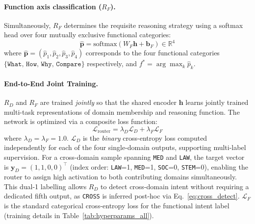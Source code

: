 \documentclass[a4paper,fleql,doubleblind]{cas-sc}
\begin{document}
\paragraph{Function axis classification ($R_F$).}
Simultaneously, $R_F$ determines the requisite reasoning strategy using a
softmax head over four mutually exclusive functional categories:
\begin{equation}
    \hat{\mathbf{p}} = \text{softmax}(W_F \mathbf{h} + \mathbf{b}_F)
    \in \mathbb{R}^4
    \label{eq:func}
\end{equation}
where $\hat{\mathbf{p}} = (\hat{p}_1, \hat{p}_2, \hat{p}_3, \hat{p}_4)$
corresponds to the four functional categories
$\{\texttt{What},\, \texttt{How},\, \texttt{Why},\, \texttt{Compare}\}$
respectively, and $f^* = \arg\max_k \hat{p}_k$.

\paragraph{End-to-End Joint Training.}
$R_D$ and $R_F$ are trained \emph{jointly} so that the shared encoder
$\mathbf{h}$ learns jointly trained multi-task representations of domain membership and
reasoning function. The network is optimized via a composite loss function:
\begin{equation}
    \mathcal{L}_{\text{router}} = \lambda_D \mathcal{L}_{D}
    + \lambda_F \mathcal{L}_{F}
    \label{eq:joint_loss}
\end{equation}
where $\lambda_D = \lambda_F = 1.0$.
$\mathcal{L}_{D}$ is the \emph{binary} cross-entropy loss computed
independently for each of the four single-domain outputs, supporting
multi-label supervision. For a cross-domain sample spanning
\texttt{MED} and \texttt{LAW}, the target vector is
$\mathbf{y}_D = (1, 1, 0, 0)^\top$
(index order: \texttt{LAW}=1, \texttt{MED}=1, \texttt{SOC}=0,
\texttt{STEM}=0), enabling the router to assign high activation to both
contributing domains simultaneously. This dual-1 labelling allows
$R_D$ to detect cross-domain intent without requiring a dedicated
fifth output, as \texttt{CROSS} is inferred post-hoc via
Eq.~\ref{eq:cross_detect}.
$\mathcal{L}_{F}$ is the standard categorical cross-entropy loss for the functional intent label (training details in Table~\ref{tab:hyperparams_all}).

\end{document}
